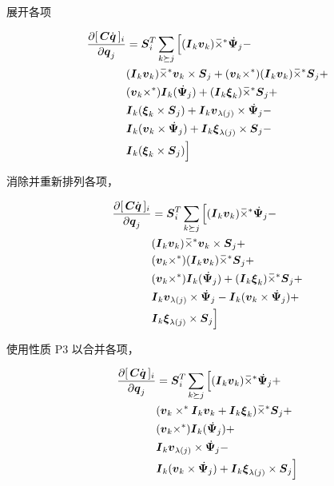 \documentclass[letterpaper, 10 pt, conference]{ieeetran}  %
\begin{document}
{\begin{enumerate}
 展开各项 

   \begin{equation}
      \begin{aligned}
         \frac{\partial  [\,\C \qd\,]_{i}}{\partial \q_{j}} &=   \Phibar_{i}^{T}  \sum_{k \succeq j} \Big[  (\I_{k} \v_{k}) \crff \Psibardot_{j} - \\&
         (\I_{k} \v_{k}) \crff \v_{k}\times \Phibar_{j}  +
         (\v_{k} \times^*) (\I_{k} \v_{k}) \crff \Phibar_{j} + \\&
         (\v_{k} \times^*) \I_{k}(\Psibardot_{j})  +  (\I_{k} \xibar_{k} ) \crff \Phibar_{j} +\\& 
         \I_{k}(\xibar_{k}  \times \Phibar_{j})  + 
         \I_{k} \v_{\lambda(j)} \times \Psibardot_{j} -  \\& 
         \I_{k}( \v_{k} \times \Psibardot_{j})+
         \I_{k}\xibar_{\lambda(j)} \times \Phibar_{j} - \\&
         \I_{k} (\xibar_{k} \times \Phibar_{j}) \Big]  
        \label{partial_Cqdot_8}
      \end{aligned}
\end{equation}

消除并重新排列各项，

   \begin{equation}
      \begin{aligned}
         \frac{\partial  [\,\C \qd\,]_{i}}{\partial \q_{j}} &=   \Phibar_{i}^{T}  \sum_{k \succeq j} \Big[  (\I_{k} \v_{k}) \crff \Psibardot_{j} -  \\&
         (\I_{k} \v_{k}) \crff \v_{k}\times \Phibar_{j}   +   \\& (\v_{k} \times^*) (\I_{k} \v_{k}) \crff \Phibar_{j} + \\&
         (\v_{k} \times^*) \I_{k}(\Psibardot_{j}) +  (\I_{k} \xibar_{k} ) \crff \Phibar_{j}  +  \\&
         \I_{k} \v_{\lambda(j)} \times \Psibardot_{j} -  \I_{k}( \v_{k} \times \Psibardot_{j})  + \\&
         \I_{k}\xibar_{\lambda(j)} \times \Phibar_{j}  \Big]  
        \label{partial_Cqdot_9}
      \end{aligned}
\end{equation}

使用性质 P3 以合并各项，

   \begin{equation}
      \begin{aligned}
         \frac{\partial  [\,\C \qd\,]_{i}}{\partial \q_{j}} &=   \Phibar_{i}^{T}  \sum_{k \succeq j} \Big[  (\I_{k} \v_{k}) \crff \Psibardot_{j} +\\&
         (\v_{k} \times^* \I_{k} \v_{k} +\I_{k}  \xibar_{k}) \crff\Phibar_{j}  + \\&
         (\v_{k} \times^*) \I_{k}(\Psibardot_{j})  + \\&
         \I_{k} \v_{\lambda(j)} \times 
         \Psibardot_{j} - \\&
         \I_{k}( \v_{k} \times \Psibardot_{j})  + \I_{k}\xibar_{\lambda(j)} \times \Phibar_{j}  \Big]  
        \label{partial_Cqdot_10}
      \end{aligned}
\end{equation}
 

\end{enumerate}}
\end{document}
